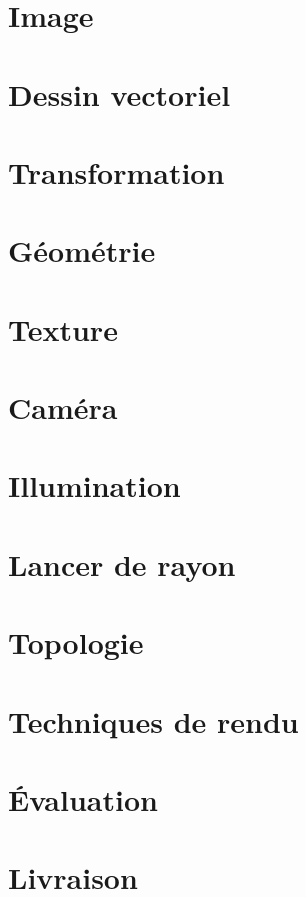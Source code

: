 \documentclass[12pt]{article}
\begin{document}
\pagebreak

\section{Image}

\pagebreak

\section{Dessin vectoriel}

\pagebreak

\section{Transformation}

\pagebreak

\section{Géométrie}

\pagebreak

\section{Texture}

\pagebreak

\section{Caméra}

\pagebreak

\section{Illumination}

\pagebreak

\section{Lancer de rayon}

\pagebreak

\section{Topologie}

\pagebreak

\section{Techniques de rendu}

\pagebreak

\section*{Évaluation}

\pagebreak

\section*{Livraison}

\pagebreak
\end{document}
